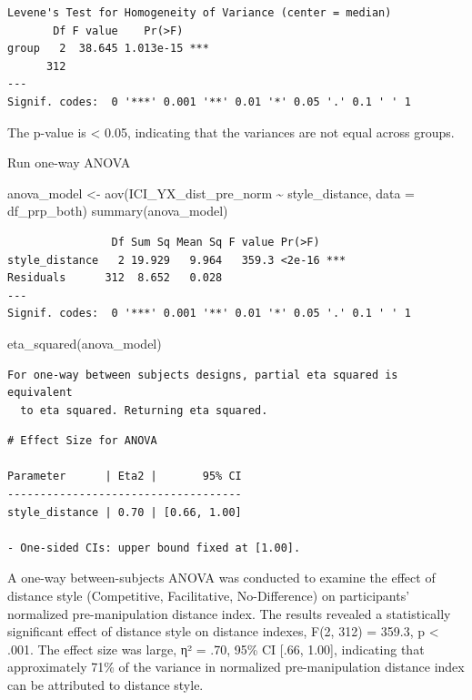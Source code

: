 \documentclass[
  letterpaper,
  DIV=11,
  numbers=noendperiod]{scrartcl}
\newenvironment{Shaded}{\begin{snugshade}}{\end{snugshade}}
\newcommand{\AttributeTok}[1]{\textcolor[rgb]{0.40,0.45,0.13}{#1}}
\newcommand{\FunctionTok}[1]{\textcolor[rgb]{0.28,0.35,0.67}{#1}}
\newcommand{\NormalTok}[1]{\textcolor[rgb]{0.00,0.23,0.31}{#1}}
\newcommand{\OtherTok}[1]{\textcolor[rgb]{0.00,0.23,0.31}{#1}}
\newcommand{\SpecialCharTok}[1]{\textcolor[rgb]{0.37,0.37,0.37}{#1}}
\begin{document}
\begin{verbatim}
Levene's Test for Homogeneity of Variance (center = median)
       Df F value    Pr(>F)    
group   2  38.645 1.013e-15 ***
      312                      
---
Signif. codes:  0 '***' 0.001 '**' 0.01 '*' 0.05 '.' 0.1 ' ' 1
\end{verbatim}

The p-value is \textless{} 0.05, indicating that the variances are not
equal across groups.

Run one-way ANOVA

\begin{Shaded}
\begin{Highlighting}[]
\NormalTok{anova\_model }\OtherTok{\textless{}{-}} \FunctionTok{aov}\NormalTok{(ICI\_YX\_dist\_pre\_norm }\SpecialCharTok{\textasciitilde{}}\NormalTok{ style\_distance, }\AttributeTok{data =}\NormalTok{ df\_prp\_both)}
\FunctionTok{summary}\NormalTok{(anova\_model)}
\end{Highlighting}
\end{Shaded}

\begin{verbatim}
                Df Sum Sq Mean Sq F value Pr(>F)    
style_distance   2 19.929   9.964   359.3 <2e-16 ***
Residuals      312  8.652   0.028                   
---
Signif. codes:  0 '***' 0.001 '**' 0.01 '*' 0.05 '.' 0.1 ' ' 1
\end{verbatim}

\begin{Shaded}
\begin{Highlighting}[]
\FunctionTok{eta\_squared}\NormalTok{(anova\_model)}
\end{Highlighting}
\end{Shaded}

\begin{verbatim}
For one-way between subjects designs, partial eta squared is equivalent
  to eta squared. Returning eta squared.
\end{verbatim}

\begin{verbatim}
# Effect Size for ANOVA

Parameter      | Eta2 |       95% CI
------------------------------------
style_distance | 0.70 | [0.66, 1.00]

- One-sided CIs: upper bound fixed at [1.00].
\end{verbatim}

A one-way between-subjects ANOVA was conducted to examine the effect of
distance style (Competitive, Facilitative, No-Difference) on
participants' normalized pre-manipulation distance index. The results
revealed a statistically significant effect of distance style on
distance indexes, F(2, 312) = 359.3, p \textless{} .001. The effect size
was large, η² = .70, 95\% CI {[}.66, 1.00{]}, indicating that
approximately 71\% of the variance in normalized pre-manipulation
distance index can be attributed to distance style.
\end{document}
